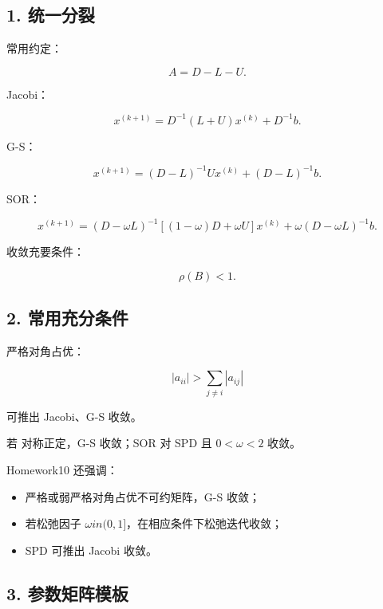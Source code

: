 \documentclass[11pt,a4paper]{ctexart}
\newcommand{\code}[1]{\begingroup\ttfamily\small #1\endgroup}
\begin{document}

\subsection*{1. 统一分裂}


常用约定：

\[
A=D-L-U.
\]

Jacobi：

\[
x^{(k+1)}=D^{-1}(L+U)x^{(k)}+D^{-1}b.
\]

G-S：

\[
x^{(k+1)}=(D-L)^{-1}Ux^{(k)}+(D-L)^{-1}b.
\]

SOR：

\[
x^{(k+1)}
=(D-\omega L)^{-1}[(1-\omega)D+\omega U]x^{(k)}
+\omega(D-\omega L)^{-1}b.
\]

收敛充要条件：

\[
\rho(B)<1.
\]


\subsection*{2. 常用充分条件}


严格对角占优：

\[
|a_{ii}|>\sum_{j\ne i}|a_{ij}|
\]

可推出 Jacobi、G-S 收敛。

若 \code{} 对称正定，G-S 收敛；SOR 对 SPD 且 $0<\omega<2$ 收敛。

Homework10 还强调：

\begin{itemize}

\item 严格或弱严格对角占优不可约矩阵，G-S 收敛；

\item 若松弛因子 $\omega in (0,1]$，在相应条件下松弛迭代收敛；

\item \code{} SPD 可推出 Jacobi 收敛。

\end{itemize}


\subsection*{3. 参数矩阵模板}
\end{document}
